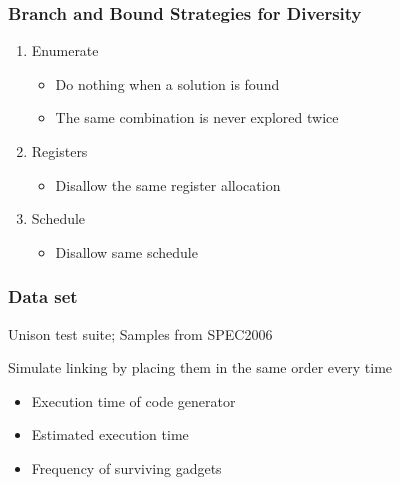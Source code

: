 \begin{frame}
	\frametitle{Branch and Bound Strategies for Diversity}

	\begin{enumerate}
		\item Enumerate
			\begin{itemize}
				\item Do nothing when a solution is found
				\item The same combination is never explored twice
			\end{itemize}
		\item Registers
			\begin{itemize}
				\item Disallow the same register allocation
			\end{itemize}
		\item Schedule
			\begin{itemize}
				\item Disallow same schedule
			\end{itemize}
	\end{enumerate}

\end{frame}

\begin{frame}
	\frametitle{Data set}

	Unison test suite; Samples from SPEC2006

	\vspace{0.5cm}

	Simulate linking by placing them in the same order every time

	\vspace{0.5cm}
	
	\begin{itemize}
		\item	Execution time of code generator
		\item	Estimated execution time
		\item	Frequency of surviving gadgets
	\end{itemize}

\end{frame}

